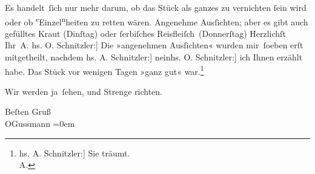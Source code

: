 \pstart
           Es handelt ſich nur mehr darum, ob das Stück als {\pb}ganzes zu vernichten{ }ſein wird oder ob \substVorne{}\textsuperscript{e}\substDazwischen{}E\substHinten{}inzel\substVorne{}\textsuperscript{n}\substDazwischen{}h\substHinten{}eiten zu retten wären. Angenehme Ausſichten; aber es gibt auch gefülltes
               Kraut (Dinſtag) oder{ }ſerbiſches
               Reisfleiſch (Donnerſtag)\pend
           \pstart Herzlichſt Ihr \spacefill\mbox{A.}\pend{}\vspace{1em}
\pstart
           \noindent{}{\pb}{[}hs. O. Schnitzler:{]} Die »angenehmen Ausſichten« wurden mir ſoeben erſt
               mitgetheilt, nachdem \introOben{}{[}hs. A. Schnitzler:{]} nein\introOben{}{ }{[}hs. O. Schnitzler:{]} ich Ihnen erzählt habe. Das Stück vor wenigen Tagen »ganz gut«
                  war.\footnote{\noindent{}{[}hs. A. Schnitzler:{]} Sie träumt.{\\}A.}\pend
           
\pstart
           Wir werden ja ſehen, und Strenge richten.\pend
           
\pstart
           Beſten Gruß{\\[\baselineskip]}\spacefill\mbox{OGussmann}\pend
           \leftskip=0em{}\endnumbering{}
\begin{anhang}
\end{anhang}\newcommand{\dateiname}{L04219}\newcommand{\titel}{Arthur Schnitzler und Olga Gussmann an Gustav Schwarzkopf, 16. 2. 1903}\newcommand{\editorInnen}{Herausgegeben von Jahnke, SelmaMüller, Martin Anton}
